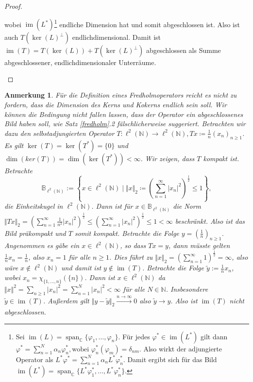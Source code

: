 \documentclass[11pt, hidelinks]{article}
\newcommand{\im}{\operatorname{im}}
\numberwithin{conj}{section}
\newtheorem{remark}[conj]{Anmerkung}
\begin{document}
\begin{proof}
\begin{itemize}
    wobei $\im(L^\ast)$\footnote{Sei $\im(L) = \operatorname{span}_\mathbb{C}\{\varphi_1, \dots, \varphi_n\}$. Für jedes \( \varphi^\ast \in \im(L^\ast) \) gilt dann $\varphi^\ast = \sum_{n=1}^N \alpha_n \varphi_n^\ast, \text{wobei } \varphi_n^\ast(\varphi_m) = \delta_{nm}$. Also wirkt der adjungierte Operator als $L^\ast \varphi^\ast = \sum_{n=1}^N \alpha_n L^\ast \varphi_n^\ast$. Damit ergibt sich für das Bild \( \im(L^\ast) = \operatorname{span}_{\mathbb{C}}\{L^\ast \varphi_1^\ast, \dots, L^\ast \varphi_n^\ast\} \).} endliche Dimension hat und somit abgeschlossen ist. Also ist auch $T(\ker(L)^\perp)$ endlichdimensional. Damit ist $\im(T) = T(\ker(L)) + T(\ker(L)^\perp)$ abgeschlossen als Summe abgeschlossener, endlichdimensionaler Unterräume.
\end{itemize}
\end{proof}

\begin{remark}
Für die Definition eines Fredholmoperators reicht es nicht zu fordern, dass die Dimension des Kerns und Kokerns endlich sein soll. Wir können die Bedingung nicht fallen lassen, dass der Operator ein abgeschlossenes Bild haben soll, wie Satz \ref{fredholm}.2 fälschlicherweise suggeriert. Betrachten wir dazu den selbstadjungierten Operator $T: \ell^2(\mathbb{N}) \to \ell^2(\mathbb{N}), Tx \coloneq \frac{1}{n} (x_n)_{n \geq 1}$. Es gilt $\ker(T) = \ker(T^\ast) = \{0\}$ und $\dim(ker(T)) = \dim(\ker(T^\ast)) < \infty$. Wir zeigen, dass $T$ kompakt ist. Betrachte $$\mathbb{B}_{\ell^2(\mathbb{N})} := \left\{ x \in \ell^2(\mathbb{N}) \; \bigg\vert \; \Vert x \Vert_2 \coloneq \left(\sum_{n=1}^{\infty} \vert x_n \vert^2\right)^{\frac{1}{2}} \leq 1 \right\},$$ die Einheitskugel in $\ell^2(\mathbb{N})$. Dann ist für $x \in \mathbb{B}_{\ell^2(\mathbb{N})}$ die Norm $\Vert Tx \Vert_2 = (\sum_{n=1}^\infty \frac{1}{n^2} \vert x_n \vert^2)^\frac{1}{2} \leq (\sum_{n=1}^\infty \vert x_n \vert^2)^\frac{1}{2} \leq 1 < \infty$ beschränkt. Also ist das Bild präkompakt und $T$ somit kompakt. Betrachte die Folge $y = (\frac{1}{n})_{n \geq 1}$. Angenommen es gäbe ein $x \in \ell^2(\mathbb{N})$, so dass $Tx = y$, dann müsste gelten $\frac{1}{n} x_n = \frac{1}{n}$, also $x_n = 1$ für alle $n \geq 1$. Dies führt zu $\Vert x \Vert_2 = \left( \sum_{n=1}^{\infty} 1 \right)^\frac{1}{2} = \infty$, also wäre $x \notin \ell^2(\mathbb{N})$ und damit ist $y \notin \im(T)$. Betrachte die Folge $\widetilde{y} := \frac{1}{n} x_n$, wobei \( x_n = \chi_{\{1, \ldots, n\}}(\{n\})\). Dann ist $x \in \ell^2(\mathbb{N})$ da \( \Vert x \Vert^2 = \sum_{n \geq 1} \vert x_n \vert^2 = \sum_{n=1}^{N} \vert x_n \vert^2 < \infty\) für alle \( N \in \mathbb{N} \). Insbesondere $\widetilde{y} \in \im(T)$. Außerdem gilt $\Vert y - \widetilde{y} \Vert_2 \xrightarrow[]{n \to \infty} 0$ also $\widetilde{y} \to y$. Also ist $\im(T)$ nicht abgeschlossen.
\end{remark}
\end{document}
